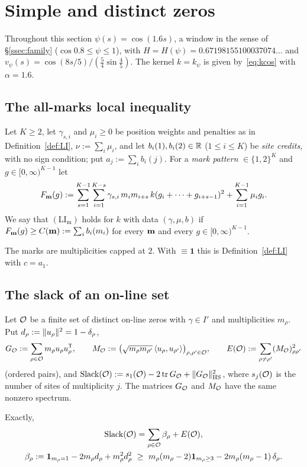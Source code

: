 \section{Simple and distinct zeros}\label{sec:simple}

Throughout this section $\psi(s)=\cos(1.6s)$, a window in the sense of \S\ref{ssec:family} ($\cos0.8\le\psi\le1$), with
$H=H(\psi)=0.67198155100037074\ldots$ and $v_\psi(s)=\cos(8s/5)/(\frac54\sin\frac45)$. The kernel $k=k_\psi$ is given by~\eqref{eq:kcos} with
$\alpha=1.6$.

\subsection{The all-marks local inequality}
\begin{definition}\label{def:LIm}
Let $K\ge2$, let $\gamma_{s,i}$ and $\mu_i\ge0$ be position weights and penalties as in Definition~\ref{def:LI}, $\nu:=\sum_i\mu_i$, and let
$b_i(1),b_i(2)\in\mathbb R$ ($1\le i\le K$) be \emph{site credits}, with no sign condition; put $a_j:=\sum_ib_i(j)$. For a \emph{mark pattern}
$\bm\in\{1,2\}^K$ and $g\in[0,\infty)^{K-1}$ let
\[
F_{\mathbf m}(g):=\sum_{s=1}^{K-1}\sum_{i=1}^{K-s}\gamma_{s,i}\,m_im_{i+s}\,k(g_i+\dots+g_{i+s-1})^2+\sum_{i=1}^{K-1}\mu_ig_i .
\]
We say that $(\mathrm{LI}_{\mathrm m})$ holds for $k$ with data $(\gamma,\mu,b)$ if $F_{\mathbf m}(g)\ge C(\mathbf m):=\sum_ib_i(m_i)$ for every $\mathbf m$ and
every $g\in[0,\infty)^{K-1}$.
\end{definition}

The marks are multiplicities capped at $2$. With $\bm\equiv\mathbf1$ this is Definition~\ref{def:LI} with $c=a_1$.

\subsection{The slack of an on-line set}
Let $\mathcal O$ be a finite set of distinct on-line zeros with $\gamma\in I'$ and multiplicities $m_\rho$. Put $d_\rho:=\lVert u_\rho\rVert^2=1-\delta_\rho$,
\[
G_\mathcal O:=\sum_{\rho\in\mathcal O}m_\rho u_\rho u_\rho^{\mathsf T},\qquad M_\mathcal O:=\big(\sqrt{m_\rho m_{\rho'}}\,\langle u_\rho,u_{\rho'}\rangle\big)_{\rho,\rho'\in\mathcal O},
\qquad E(\mathcal O):=\sum_{\rho\ne\rho'}(M_\mathcal O)_{\rho\rho'}^2
\]
(ordered pairs), and $\operatorname{Slack}(\mathcal O):=s_1(\mathcal O)-2\operatorname{tr} G_\mathcal O+\lVert G_\mathcal O\rVert_{\mathrm{HS}}^2$, where $s_j(\mathcal O)$ is the number of sites of multiplicity $j$. The matrices
$G_\mathcal O$ and $M_\mathcal O$ have the same nonzero spectrum.

\begin{lemma}\label{lem:onslack}
Exactly,
\begin{gather*}
\Slack(\cO)=\sum_{\rho\in\cO}\beta_\rho+E(\cO),\\
\beta_\rho:=\mathbf 1_{m_\rho=1}-2m_\rho d_\rho+m_\rho^2d_\rho^2\ \ge\ m_\rho(m_\rho-2)\mathbf1_{m_\rho\ge3}-2m_\rho(m_\rho-1)\,\delta_\rho .
\end{gather*}
\end{lemma}

